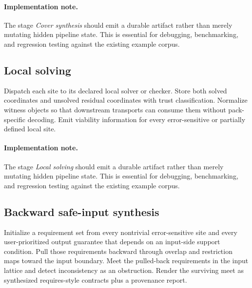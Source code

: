 \documentclass[11pt]{report}
\theoremstyle{definition}
\theoremstyle{plain}
\begin{document}
\paragraph{Implementation note.}
The stage \emph{Cover synthesis} should emit a durable artifact rather than merely
mutating hidden pipeline state. This is essential for debugging, benchmarking,
and regression testing against the existing example corpus.

\subsection{Local solving}

\begin{algorithm}[H]
\caption{Sheaf-descent stage: Local solving}
\begin{algorithmic}[1]
\State Dispatch each site to its declared local solver or checker.
\State Store both solved coordinates and unsolved residual coordinates with trust classification.
\State Normalize witness objects so that downstream transports can consume them without pack-specific decoding.
\State Emit viability information for every error-sensitive or partially defined local site.
\end{algorithmic}
\end{algorithm}


\paragraph{Implementation note.}
The stage \emph{Local solving} should emit a durable artifact rather than merely
mutating hidden pipeline state. This is essential for debugging, benchmarking,
and regression testing against the existing example corpus.

\subsection{Backward safe-input synthesis}

\begin{algorithm}[H]
\caption{Sheaf-descent stage: Backward safe-input synthesis}
\begin{algorithmic}[1]
\State Initialize a requirement set from every nontrivial error-sensitive site and every user-prioritized output guarantee that depends on an input-side support condition.
\State Pull those requirements backward through overlap and restriction maps toward the input boundary.
\State Meet the pulled-back requirements in the input lattice and detect inconsistency as an obstruction.
\State Render the surviving meet as synthesized requires-style contracts plus a provenance report.
\end{algorithmic}
\end{algorithm}
\end{document}
